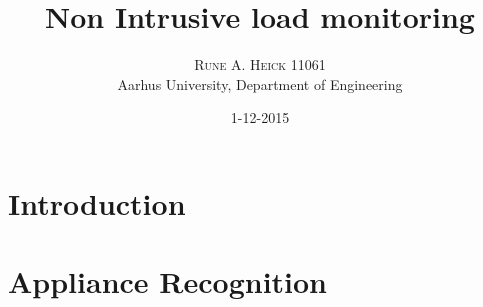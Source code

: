 


\title{\vspace{-15mm}\fontsize{24pt}{10pt}\selectfont\textbf{Non Intrusive load monitoring}} %

\author{
\large
\textsc{Rune A. Heick 11061}\\[2mm] %
\normalsize Aarhus University, Department of Engineering \\ %
\vspace{-5mm}
}
\date{1-12-2015}


\setlength{\abovedisplayskip}{1cm}
\setlength{\belowdisplayskip}{.8cm}
\maketitle %

\newpage

\begin{abstract}
\lipsum[7] %
\end{abstract}

\newpage

\tableofcontents


\chapter{Introduction}
\lipsum[1] %


 

\chapter{Appliance Recognition }
